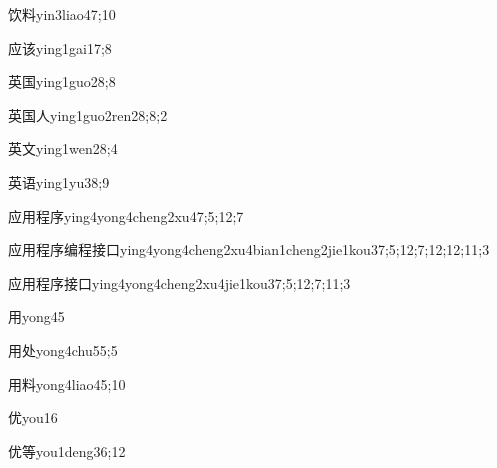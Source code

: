 \begin{verbete}{饮料}{yin3liao4}{7;10}
\end{verbete}
\begin{verbete}{应该}{ying1gai1}{7;8}
\end{verbete}
\begin{verbete}{英国}{ying1guo2}{8;8}
\end{verbete}
\begin{verbete}{英国人}{ying1guo2ren2}{8;8;2}
\end{verbete}
\begin{verbete}{英文}{ying1wen2}{8;4}
\end{verbete}
\begin{verbete}{英语}{ying1yu3}{8;9}
\end{verbete}
\begin{verbete}{应用程序}{ying4yong4cheng2xu4}{7;5;12;7}
\end{verbete}
\begin{extragrande}{应用程序编程接口}{ying4yong4cheng2xu4bian1cheng2jie1kou3}{7;5;12;7;12;12;11;3}
\end{extragrande}
\begin{extragrande}{应用程序接口}{ying4yong4cheng2xu4jie1kou3}{7;5;12;7;11;3}
\end{extragrande}
\begin{verbete}{用}{yong4}{5}
\end{verbete}
\begin{verbete}{用处}{yong4chu5}{5;5}
\end{verbete}
\begin{verbete}{用料}{yong4liao4}{5;10}
\end{verbete}
\begin{verbete}{优}{you1}{6}
\end{verbete}
\begin{verbete}{优等}{you1deng3}{6;12}
\end{verbete}
